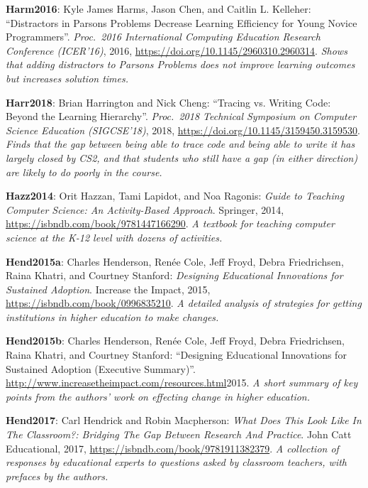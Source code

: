 \textbf{\hypertarget{b:Harm2016}{Harm2016}\label{b:Harm2016}}: Kyle James Harms, Jason Chen, and Caitlin L. Kelleher: ``Distractors in Parsons Problems Decrease Learning Efficiency for Young Novice Programmers''. \emph{Proc.\ 2016 International Computing Education Research Conference (ICER'16)}, 2016, \url{https://doi.org/10.1145/2960310.2960314}. \emph{Shows that adding distractors to Parsons Problems does not improve learning outcomes but increases solution times.}

\textbf{\hypertarget{b:Harr2018}{Harr2018}\label{b:Harr2018}}: Brian Harrington and Nick Cheng: ``Tracing vs. Writing Code: Beyond the Learning Hierarchy''. \emph{Proc.\ 2018 Technical Symposium on Computer Science Education (SIGCSE'18)}, 2018, \url{https://doi.org/10.1145/3159450.3159530}. \emph{Finds that the gap between being able to trace code and being able to write it has largely closed by CS2, and that students who still have a gap (in either direction) are likely to do poorly in the course.}

\textbf{\hypertarget{b:Hazz2014}{Hazz2014}\label{b:Hazz2014}}: Orit Hazzan, Tami Lapidot, and Noa Ragonis: \emph{Guide to Teaching Computer Science: An Activity-Based Approach}. Springer, 2014, \url{https://isbndb.com/book/9781447166290}. \emph{A textbook for teaching computer science at the K-12 level with dozens of activities.}

\textbf{\hypertarget{b:Hend2015a}{Hend2015a}\label{b:Hend2015a}}: Charles Henderson, Renée Cole, Jeff Froyd, Debra Friedrichsen, Raina Khatri, and Courtney Stanford: \emph{Designing Educational Innovations for Sustained Adoption}. Increase the Impact, 2015, \url{https://isbndb.com/book/0996835210}. \emph{A detailed analysis of strategies for getting institutions in higher education to make changes.}

\textbf{\hypertarget{b:Hend2015b}{Hend2015b}\label{b:Hend2015b}}: Charles Henderson, Renée Cole, Jeff Froyd, Debra Friedrichsen, Raina Khatri, and Courtney Stanford: ``Designing Educational Innovations for Sustained Adoption (Executive Summary)''. \url{http://www.increasetheimpact.com/resources.html}2015. \emph{A short summary of key points from the authors' work on effecting change in higher education.}

\textbf{\hypertarget{b:Hend2017}{Hend2017}\label{b:Hend2017}}: Carl Hendrick and Robin Macpherson: \emph{What Does This Look Like In The Classroom?: Bridging The Gap Between Research And Practice}. John Catt Educational, 2017, \url{https://isbndb.com/book/9781911382379}. \emph{A collection of responses by educational experts to questions asked by classroom teachers, with prefaces by the authors.}


